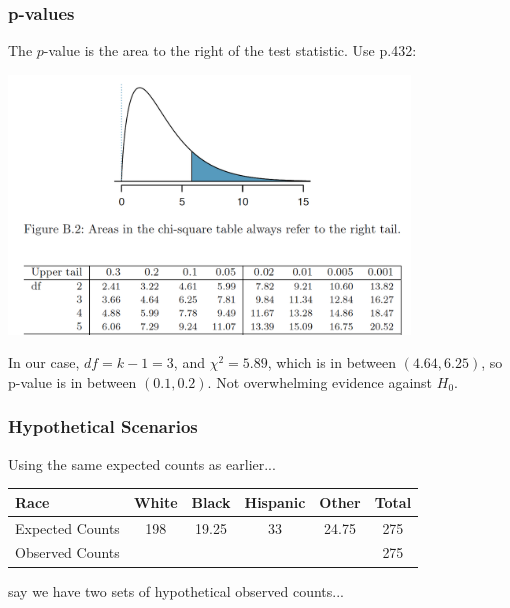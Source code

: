 \documentclass[handout]{beamer}
\newcommand{\blue}[1]{\textcolor{blue2}{#1}}
\begin{document}
\begin{frame}[fragile]
\frametitle{p-values}
The $p$-value is the \blue{area to the right} of the test statistic.  Use p.432:
\begin{center}
\includegraphics[width=0.8\textwidth]{figure/table.png}
\end{center}
%

\pause In our case, $df=k-1=3$, and $\chi^2=5.89$, which is in between $(4.64, 6.25)$, so p-value is in between $(0.1, 0.2)$.  Not overwhelming evidence against $H_0$.

\end{frame}


\begin{frame}[fragile]
\frametitle{Hypothetical Scenarios}
Using the same expected counts as earlier...

\begin{center}
\begin{tabular}{l||cccc|c}
Race & White & Black & Hispanic & Other & Total \\ 
\hline
Expected Counts & 198 & 19.25 & 33 & 24.75 & 275\\ 
Observed Counts &  &  &  &  & 275 \\ 
\end{tabular}
\end{center}

say we have two sets of hypothetical observed counts...

%
%

\end{frame}
\end{document}
